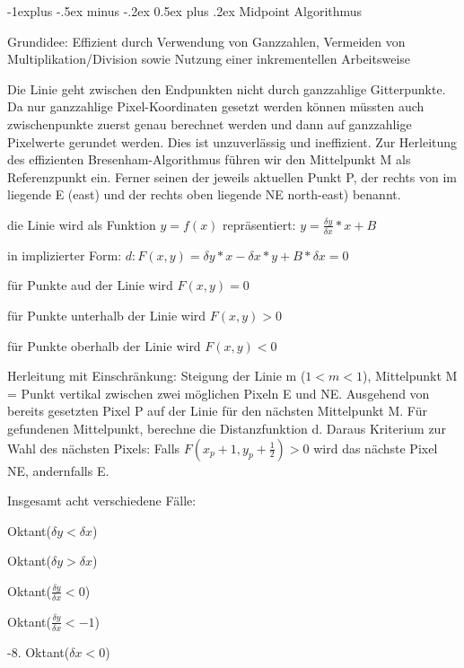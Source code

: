 \documentclass[landscape]{article}
\makeatletter
\renewcommand{\subsection}{\@startsection{subsection}{2}{0mm}%
                                {-1explus -.5ex minus -.2ex}%
                                {0.5ex plus .2ex}%
                                {\normalfont\normalsize\bfseries}}
\makeatother
\begin{document}
\begin{multicols}{3}
  \subsection{ Midpoint Algorithmus}
  \begin{itemize*}
    \item Grundidee: Effizient durch Verwendung von Ganzzahlen, Vermeiden von Multiplikation/Division sowie Nutzung einer inkrementellen Arbeitsweise
    \item Die Linie geht zwischen den Endpunkten nicht durch ganzzahlige Gitterpunkte. Da nur ganzzahlige Pixel-Koordinaten gesetzt werden können müssten auch zwischenpunkte zuerst genau berechnet werden und dann auf ganzzahlige Pixelwerte gerundet werden. Dies ist unzuverlässig und ineffizient. Zur Herleitung des effizienten Bresenham-Algorithmus führen wir den Mittelpunkt M als Referenzpunkt ein. Ferner seinen der jeweils aktuellen Punkt P, der rechts von im liegende E (east) und der rechts oben liegende NE north-east) benannt.
    \item die Linie wird als Funktion $y=f(x)$ repräsentiert: $y=\frac{\delta y}{\delta x}*x+B$
    \item in implizierter Form: $d: F(x,y)=\delta y*x-\delta x*y+B*\delta x = 0$
    \item für Punkte aud der Linie wird $F(x,y)=0$
    \item für Punkte unterhalb der Linie wird $F(x,y)>0$
    \item für Punkte oberhalb der Linie wird $F(x,y)<0$
    \item Herleitung mit Einschränkung: Steigung der Linie m ($1 < m < 1$), Mittelpunkt M = Punkt vertikal zwischen zwei möglichen Pixeln E und NE. Ausgehend von bereits gesetzten Pixel P auf der Linie für den nächsten Mittelpunkt M. Für gefundenen Mittelpunkt, berechne die Distanzfunktion d. Daraus Kriterium zur Wahl des nächsten Pixels: Falls $F(x_p + 1, y_p+\frac{1}{2})>0$ wird das nächste Pixel NE, andernfalls E.
    \item Insgesamt acht verschiedene Fälle:
          \begin{enumerate*}
            \item Oktant($\delta y < \delta x$)
            \item Oktant($\delta y > \delta x$)
            \item Oktant($\frac{\delta y}{\delta x}<  0$)
            \item Oktant($\frac{\delta y}{\delta x}< -1$)
            \item -8. Oktant($\delta x < 0$)
          \end{enumerate*}
  \end{itemize*}
  

\end{multicols}
\end{document}
